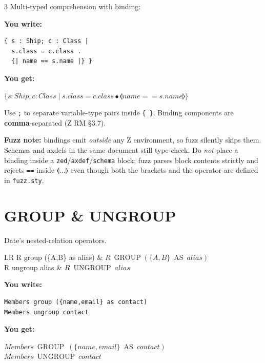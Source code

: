 \documentclass[10pt,landscape,a4paper]{article}
\newenvironment{exwrite}%
  {\par\noindent\scriptsize\textbf{You write:}\par\vspace{0pt}\scriptsize}%
  {\vspace{1pt}}
\newenvironment{exget}%
  {\par\noindent\scriptsize\textbf{You get:}\par\vspace{0pt}\small}%
  {\par\vspace{3pt}}
\begin{document}
\begin{multicols}{3}
\smallskip
{\scriptsize Multi-typed comprehension with binding:}

\begin{exwrite}
\begin{verbatim}
{ s : Ship; c : Class |
  s.class = c.class .
  {| name == s.name |} }
\end{verbatim}
\end{exwrite}
\begin{exget}
\begin{center}
$\{ s : Ship; c : Class \mid s.class = c.class \bullet \lblot name == s.name \rblot \}$
\end{center}
\end{exget}

{\scriptsize Use \texttt{;} to separate variable-type pairs inside \texttt{\{ \}}. Binding components are \textbf{comma}-separated (Z RM §3.7).}

\smallskip
{\scriptsize\textbf{Fuzz note:} bindings emit \emph{outside} any Z environment, so fuzz silently skips them. Schemas and axdefs in the same document still type-check. Do \emph{not} place a binding inside a \texttt{zed}/\texttt{axdef}/\texttt{schema} block; fuzz parses block contents strictly and rejects \texttt{==} inside $\lblot \ldots \rblot$ even though both the brackets and the operator are defined in \texttt{fuzz.sty}.}

\section{GROUP \& UNGROUP}

{\scriptsize Date's nested-relation operators.}

\begin{tabularx}{\columnwidth}{LR}
R group (\{A,B\} as alias) & $R\ \mathop{\mathrm{GROUP}} (\{A,B\}\ \mathop{\mathrm{AS}}\ alias)$ \\
R ungroup alias    & $R\ \mathop{\mathrm{UNGROUP}}\ alias$ \\
\end{tabularx}

\begin{exwrite}
\begin{verbatim}
Members group ({name,email} as contact)
Members ungroup contact
\end{verbatim}
\end{exwrite}
\begin{exget}
\begin{center}
$Members\ \mathop{\mathrm{GROUP}}\ (\{name,email\}\ \mathop{\mathrm{AS}}\ contact)$\\[3pt]
$Members\ \mathop{\mathrm{UNGROUP}}\ contact$
\end{center}
\end{exget}


\end{multicols}
\end{document}
